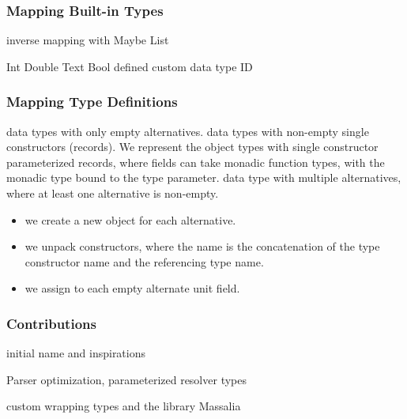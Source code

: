 \begin{frame}\frametitle{Mapping Built-in Types}
\begin{itemize}
  \begin{itemize}
     inverse mapping with Maybe
     List
  \end{itemize}
  \begin{itemize}
     Int
     Double
     Text
     Bool
      defined custom data type ID 
  \end{itemize}
\end{itemize}
\end{frame}

\begin{frame}\frametitle{Mapping Type Definitions}

\begin{itemize}
   data types with only empty alternatives.
   data types with non-empty single constructors (records). 
   We represent the object types with single constructor parameterized records, where fields can take monadic function types, with the monadic type bound to the type parameter. 
   data type with multiple alternatives, where at least one alternative is non-empty.
  \begin{itemize}
    \item we create a new object for each alternative.
    \item we unpack constructors, where the name is the concatenation of the type constructor name and the referencing type name. 
    \item we assign to each empty alternate unit field.
  \end{itemize}
\end{itemize}

\end{frame}

\begin{frame}\frametitle{Contributions}

\begin{itemize} 
  
     initial name and inspirations

     Parser optimization, parameterized resolver types
    
     custom wrapping types and the library Massalia

\end{itemize}

\end{frame}